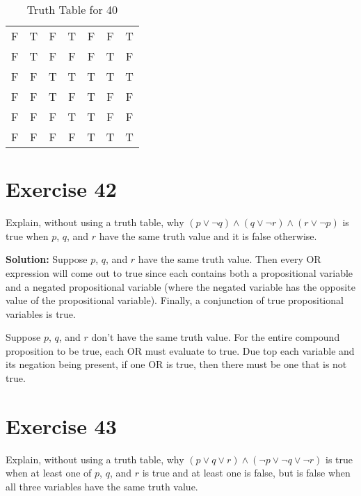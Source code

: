 \documentclass{Axon}
\begin{document}
\begin{table}[ht]
\begin{tabular}{c|c|c|c|c|c|c}
    F     & T     & F     & T     & F                       & F                       & T                                                               \\
    F     & T     & F     & F     & F                       & T                       & F                                                               \\
    F     & F     & T     & T     & T                       & T                       & T                                                               \\
    F     & F     & T     & F     & T                       & F                       & F                                                               \\
    F     & F     & F     & T     & T                       & F                       & F                                                               \\
    F     & F     & F     & F     & T                       & T                       & T
    \end{tabular}
    \caption{Truth Table for 40}
\end{table}

\section*{Exercise 42}
Explain, without using a truth table, why \((p \lor \lnot q) \land (q \lor \lnot r) \land (r \lor \lnot p)\) is true when \(p\), \(q\), and \(r\) have the same truth value and it is false otherwise.

\noindent
\textbf{Solution:}
Suppose \(p\), \(q\), and \(r\) have the same truth value. Then every OR expression will come out to true since each contains both a propositional variable and a negated propositional variable (where the negated variable has the opposite value of the propositional variable). Finally, a conjunction of true propositional variables is true.

Suppose \(p\), \(q\), and \(r\) don't have the same truth value. For the entire compound proposition to be true, each OR must evaluate to true. Due top each variable and its negation being present, if one OR is true, then there must be one that is not true.

\section*{Exercise 43}
Explain, without using a truth table, why \((p \lor q \lor r) \land (\lnot p \lor \lnot q \lor \lnot r)\) is true when at least one of \(p\), \(q\), and \(r\) is true and at least one is false, but is false when all three variables have the same truth value.
\end{document}
